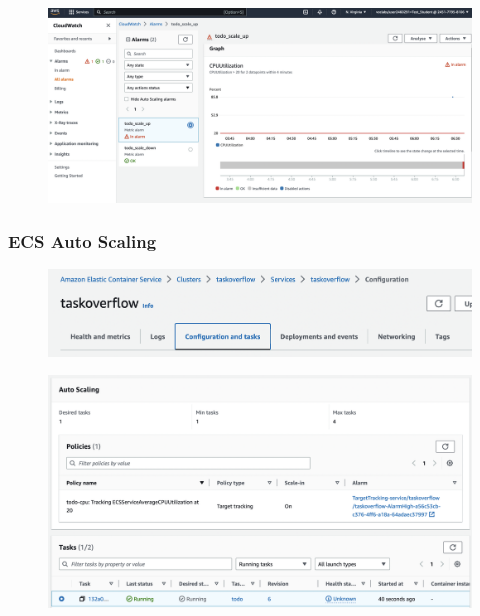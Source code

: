 \documentclass{csse4400}
\begin{document}
\begin{figure}[H]
  \begin{center}
    \includegraphics[width=\textwidth]{images/ec2_7}
  \end{center}
\end{figure}

\subsubsection{ECS Auto Scaling}


\begin{figure}[H]
  \begin{center}
    \includegraphics[width=\textwidth]{images/ecs1}
  \end{center}
\end{figure}

\begin{figure}[H]
  \begin{center}
    \includegraphics[width=\textwidth]{images/ecs2}
  \end{center}
\end{figure}
\end{document}
